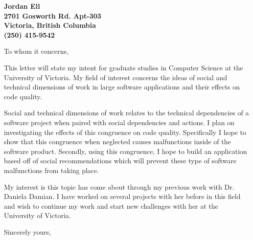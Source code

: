 \documentclass[11pt]{letter} %
\begin{document}

\begin{letter}{} 


\begin{center}
\large\bf Jordan Ell \\ %
2701 Gosworth Rd. Apt-303 \\ Victoria, British Columbia\\ (250) 415-9542 %
\end{center} 
\vfill

\signature{Jordan Ell} %


\opening{To whom it concerns,} 
 
This letter will state my intent for graduate studies in Computer Science at the University of Victoria. My field of interest concerns the ideas of social and technical dimensions of work in large software applications and their effects on code quality.

 Social and technical dimensions of work relates to the technical dependencies of a software project when paired with social dependencies and actions. 
I plan on investigating the effects of this congruence on code quality. Specifically I hope to show
that this congruence when neglected causes malfunctions inside of the software product. Secondly, using this congruence, I hope to build an application based off of social recommendations which will prevent these type of software
malfunctions from taking place.
 
My interest is this topic has come about through my previous work with Dr. Daniela Damian. I have worked on several projects with her before in this field and wish to continue my work and start new challenges with her at the University 
of Victoria.

\closing{Sincerely yours,}



\end{letter}
\end{document}
